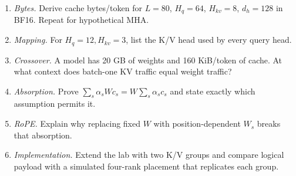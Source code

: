 \ExercisesSection
\begin{enumerate}
\item \emph{Bytes.} Derive cache bytes/token for $L=80$, $H_q=64$, $H_{kv}=8$,
$d_h=128$ in BF16. Repeat for hypothetical MHA.
\item \emph{Mapping.} For $H_q=12,H_{kv}=3$, list the K/V head used by every query head.
\item \emph{Crossover.} A model has 20 GB of weights and 160 KiB/token of cache. At what
context does batch-one KV traffic equal weight traffic?
\item \emph{Absorption.} Prove
$\sum_s\alpha_sWc_s=W\sum_s\alpha_sc_s$ and state exactly which assumption permits it.
\item \emph{RoPE.} Explain why replacing fixed $W$ with position-dependent $W_s$ breaks
that absorption.
\item \emph{Implementation.} Extend the lab with two K/V groups and compare logical
payload with a simulated four-rank placement that replicates each group.
\end{enumerate}


